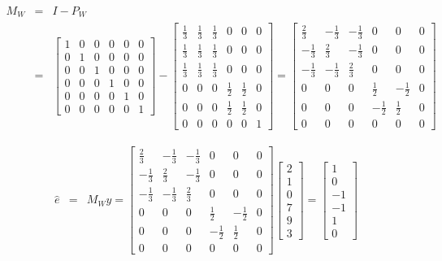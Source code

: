\documentclass[12pt,a4paper]{report}
\begin{document}
\begin{enumerate}
\begin{enumerate}
\begin{eqnarray*}
M_W &=& I - P_W \\
&=& \begin{bmatrix}
1 & 0 & 0 & 0 & 0 & 0 \\
0 & 1 & 0 & 0 & 0 & 0 \\
0 & 0 & 1 & 0 & 0 & 0 \\
0 & 0 & 0 & 1 & 0 & 0 \\
0 & 0 & 0 & 0 & 1 & 0 \\
0 & 0 & 0 & 0 & 0 & 1
\end{bmatrix} - 
\begin{bmatrix}
\frac{1}{3} & \frac{1}{3} & \frac{1}{3} & 0 & 0 & 0 \\
\frac{1}{3} & \frac{1}{3} & \frac{1}{3} & 0 & 0 & 0 \\
\frac{1}{3} & \frac{1}{3} & \frac{1}{3} & 0 & 0 & 0 \\
0 & 0 & 0 & \frac{1}{2} & \frac{1}{2} & 0 \\
0 & 0 & 0 & \frac{1}{2} & \frac{1}{2} & 0 \\
0 & 0 & 0 & 0 & 0 & 1
\end{bmatrix} =
\begin{bmatrix}
\frac{2}{3} & -\frac{1}{3} & -\frac{1}{3} & 0 & 0 & 0 \\
-\frac{1}{3} & \frac{2}{3} & -\frac{1}{3} & 0 & 0 & 0 \\
-\frac{1}{3} & -\frac{1}{3} & \frac{2}{3} & 0 & 0 & 0 \\
0 & 0 & 0 & \frac{1}{2} & -\frac{1}{2} & 0 \\
0 & 0 & 0 & -\frac{1}{2} & \frac{1}{2} & 0 \\
0 & 0 & 0 & 0 & 0 & 0
\end{bmatrix}
\end{eqnarray*}

\begin{eqnarray*}
\widehat{e} &=& M_Wy = 
\begin{bmatrix}
\frac{2}{3} & -\frac{1}{3} & -\frac{1}{3} & 0 & 0 & 0 \\
-\frac{1}{3} & \frac{2}{3} & -\frac{1}{3} & 0 & 0 & 0 \\
-\frac{1}{3} & -\frac{1}{3} & \frac{2}{3} & 0 & 0 & 0 \\
0 & 0 & 0 & \frac{1}{2} & -\frac{1}{2} & 0 \\
0 & 0 & 0 & -\frac{1}{2} & \frac{1}{2} & 0 \\
0 & 0 & 0 & 0 & 0 & 0
\end{bmatrix}
\begin{bmatrix}
2 \\
1 \\
0 \\
7 \\
9 \\
3
\end{bmatrix} = 
\begin{bmatrix}
1 \\
0 \\
-1 \\
-1 \\
1 \\
0
\end{bmatrix}
\end{eqnarray*}


\end{enumerate}
\end{enumerate}
\end{document}
